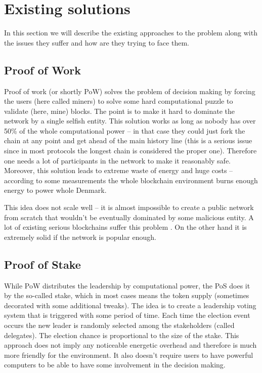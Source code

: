\section{Existing solutions}

In this section we will describe the existing approaches to the problem along
with the issues they suffer and how are they trying to face them.

\subsection{Proof of Work}

Proof of work (or shortly PoW) solves the problem of decision making by forcing the
users (here called miners) to solve some hard computational puzzle to validate
(here, mine) blocks\cite{bitcoin}.
The point is to make it hard to dominate the network by a
single selfish entity. This solution works as long as nobody has over 50\% of the whole
computational power – in that case they could just fork the chain at any point
and get ahead of the main history line (this is a serious issue since in most
protocols the longest chain is considered the proper one). Therefore one needs a
lot of participants in the network to make it reasonably safe. Moreover, this
solution leads to extreme waste of energy and huge costs – according to some
measurements the whole blockchain environment burns enough energy to power
whole Denmark\cite{bitcoin_energy}.

This idea does not scale well – it is almost impossible to create a public
network from scratch that wouldn't be eventually dominated by some malicious
entity. A lot of existing serious blockchains suffer this problem
\cite{51attack}. On the other hand it is extremely solid if
the network is popular enough.

\subsection{Proof of Stake}

While PoW distributes the leadership by computational power, the PoS does it by
the so-called stake, which in most cases means the token supply (sometimes decorated
with some additional tweaks)\cite{peercoin}\cite{cryptocurr_without_pow}.
The idea is to create a leadership voting system
that is triggered with some period of time. Each time the election event occurs
the new leader is randomly selected among the stakeholders (called delegates).
The election chance is proportional to the size of the stake. This approach does
not imply any noticeable energetic overhead and therefore is much more friendly for the
environment. It also doesn't require users to have powerful computers to be able to
have some involvement in the decision making.

